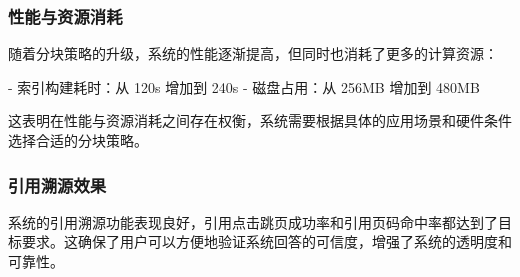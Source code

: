 \subsubsection{性能与资源消耗}

随着分块策略的升级，系统的性能逐渐提高，但同时也消耗了更多的计算资源：

- 索引构建耗时：从 120s 增加到 240s
- 磁盘占用：从 256MB 增加到 480MB

这表明在性能与资源消耗之间存在权衡，系统需要根据具体的应用场景和硬件条件选择合适的分块策略。

\subsubsection{引用溯源效果}

系统的引用溯源功能表现良好，引用点击跳页成功率和引用页码命中率都达到了目标要求。这确保了用户可以方便地验证系统回答的可信度，增强了系统的透明度和可靠性。
